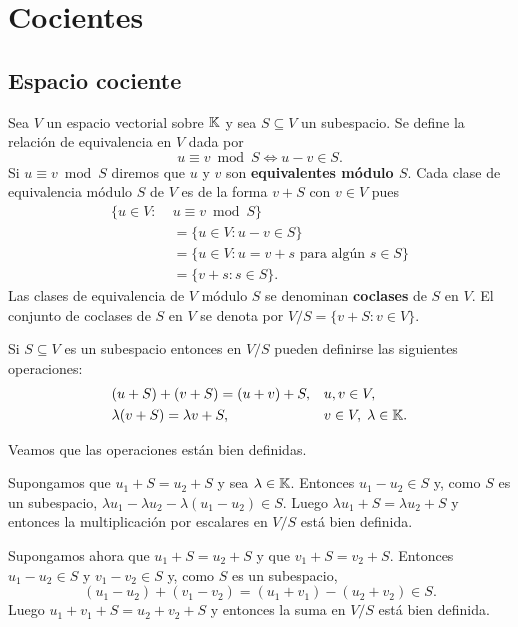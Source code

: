 \chapter{Cocientes}

\section{Espacio cociente}

\begin{block}
	Sea $V$ un espacio vectorial sobre $\mathbb{K}$ y sea $S\subseteq V$ un subespacio.
	Se define la relación de equivalencia en $V$ dada por
    \[
        u\equiv v\bmod S\Leftrightarrow u-v\in S.
    \]
    Si $u\equiv v\bmod S$ diremos que $u$ y $v$ son \textbf{equivalentes módulo
    $S$}. Cada clase de equivalencia módulo $S$ de $V$ es de la forma $v+S$ con $v\in V$ pues
    \begin{align*}
        \{u\in V:\; &u\equiv v\bmod S\}\\
        &=\{u\in V:u-v\in S\}\\
        &=\{u\in V:u=v+s\text{ para algún $s\in S$}\}\\
        &=\{v+s:s\in S\}.
    \end{align*}
    Las clases de equivalencia de $V$ módulo $S$ se denominan \textbf{coclases}
    de $S$ en $V$. El conjunto de coclases de $S$ en $V$ se denota por
    $V/S=\{v+S:v\in V\}$.
\end{block}

\begin{block}
    \label{block:V/S}
   Si $S\subseteq V$ es un subespacio entonces en $V/S$ pueden definirse las
   siguientes operaciones:
   \begin{align*}
       &(u+S)+(v+S)=(u+v)+S, && u,v\in V,\\
       &\lambda(v+S)=\lambda v+S, && v\in V,\;\lambda\in\mathbb{K}.
   \end{align*}

   Veamos que las operaciones están bien definidas. 

   Supongamos que $u_1+S=u_2+S$ y sea $\lambda\in\mathbb{K}$. Entonces $u_1-u_2\in
   S$ y, como $S$ es un subespacio, $\lambda u_1-\lambda
   u_2-\lambda(u_1-u_2)\in S$. Luego $\lambda u_1+S=\lambda u_2+S$ y
   entonces la multiplicación por escalares en $V/S$ está bien definida. 

   Supongamos ahora que $u_1+S=u_2+S$ y que $v_1+S=v_2+S$. Entonces
   $u_1-u_2\in S$ y $v_1-v_2\in S$ y, como $S$ es un subespacio, 
   \[
   (u_1-u_2)+(v_1-v_2)=(u_1+v_1)-(u_2+v_2)\in S.
   \]
   Luego $u_1+v_1+S=u_2+v_2+S$ y entonces la suma en $V/S$ está bien
   definida. 
\end{block}

